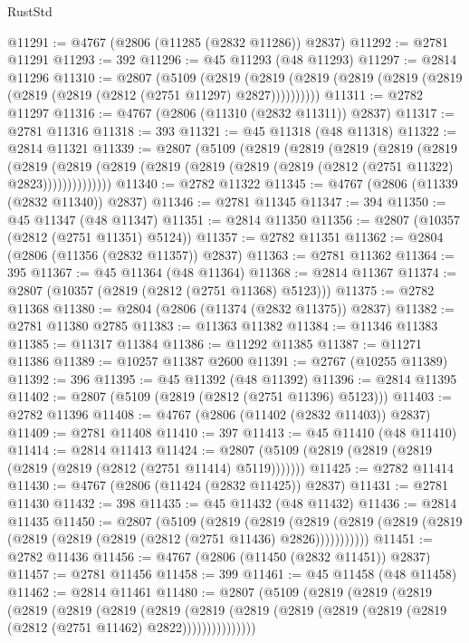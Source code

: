 \begin{lexlean}{RustStd}
\begin{coremodule}
@11291 := @4767 (@2806 (@11285 (@2832 @11286)) @2837)
@11292 := @2781 @11291
@11293 := 392
@11296 := @45 @11293 (@48 @11293)
@11297 := @2814 @11296
@11310 := @2807
    (@5109
      (@2819 (@2819 (@2819 (@2819 (@2819 (@2819 (@2819 (@2819 (@2812 (@2751 @11297) @2827))))))))))
@11311 := @2782 @11297
@11316 := @4767 (@2806 (@11310 (@2832 @11311)) @2837)
@11317 := @2781 @11316
@11318 := 393
@11321 := @45 @11318 (@48 @11318)
@11322 := @2814 @11321
@11339 := @2807
    (@5109
      (@2819
        (@2819
          (@2819
            (@2819
              (@2819
                (@2819
                  (@2819
                    (@2819 (@2819 (@2819 (@2819 (@2819 (@2812 (@2751 @11322) @2823))))))))))))))
@11340 := @2782 @11322
@11345 := @4767 (@2806 (@11339 (@2832 @11340)) @2837)
@11346 := @2781 @11345
@11347 := 394
@11350 := @45 @11347 (@48 @11347)
@11351 := @2814 @11350
@11356 := @2807 (@10357 (@2812 (@2751 @11351) @5124))
@11357 := @2782 @11351
@11362 := @2804 (@2806 (@11356 (@2832 @11357)) @2837)
@11363 := @2781 @11362
@11364 := 395
@11367 := @45 @11364 (@48 @11364)
@11368 := @2814 @11367
@11374 := @2807 (@10357 (@2819 (@2812 (@2751 @11368) @5123)))
@11375 := @2782 @11368
@11380 := @2804 (@2806 (@11374 (@2832 @11375)) @2837)
@11382 := @2781 @11380 @2785
@11383 := @11363 @11382
@11384 := @11346 @11383
@11385 := @11317 @11384
@11386 := @11292 @11385
@11387 := @11271 @11386
@11389 := @10257 @11387 @2600
@11391 := @2767 (@10255 @11389)
@11392 := 396
@11395 := @45 @11392 (@48 @11392)
@11396 := @2814 @11395
@11402 := @2807 (@5109 (@2819 (@2812 (@2751 @11396) @5123)))
@11403 := @2782 @11396
@11408 := @4767 (@2806 (@11402 (@2832 @11403)) @2837)
@11409 := @2781 @11408
@11410 := 397
@11413 := @45 @11410 (@48 @11410)
@11414 := @2814 @11413
@11424 := @2807 (@5109 (@2819 (@2819 (@2819 (@2819 (@2819 (@2812 (@2751 @11414) @5119)))))))
@11425 := @2782 @11414
@11430 := @4767 (@2806 (@11424 (@2832 @11425)) @2837)
@11431 := @2781 @11430
@11432 := 398
@11435 := @45 @11432 (@48 @11432)
@11436 := @2814 @11435
@11450 := @2807
    (@5109
      (@2819
        (@2819
          (@2819 (@2819 (@2819 (@2819 (@2819 (@2819 (@2819 (@2812 (@2751 @11436) @2826)))))))))))
@11451 := @2782 @11436
@11456 := @4767 (@2806 (@11450 (@2832 @11451)) @2837)
@11457 := @2781 @11456
@11458 := 399
@11461 := @45 @11458 (@48 @11458)
@11462 := @2814 @11461
@11480 := @2807
    (@5109
      (@2819
        (@2819
          (@2819
            (@2819
              (@2819
                (@2819
                  (@2819
                    (@2819
                      (@2819 (@2819 (@2819 (@2819 (@2819 (@2812 (@2751 @11462) @2822)))))))))))))))

\end{coremodule}
\end{lexlean}
